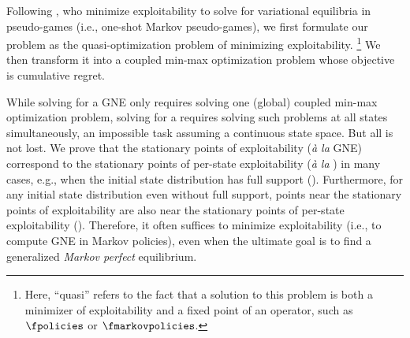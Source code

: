 Following \citet{goktas2022exploit}, who minimize exploitability to solve for variational equilibria in pseudo-games (i.e., one-shot Markov pseudo-games), we first formulate our problem as the quasi-optimization problem of minimizing exploitability.%
\footnote{Here, ``quasi'' refers to the fact that a solution to this problem is both a minimizer of exploitability and a fixed point of an operator, such as $\fpolicies$ or $\fmarkovpolicies$.}
We then transform it into a coupled min-max optimization problem whose
objective is cumulative regret.

While solving for a GNE only requires solving one (global) coupled min-max optimization problem, solving for a \MPGNE{} requires solving such problems at all states simultaneously, an impossible task assuming a continuous state space.
But all is not lost.
We prove that the stationary points of exploitability (\emph{\`a la\/} GNE) correspond to the stationary points of per-state exploitability (\emph{\`a la\/} \MPGNE) in many cases, e.g., when the initial state distribution has full support (). 
Furthermore, for any initial state distribution even without full support, points near the stationary points of exploitability are also near the stationary points of per-state exploitability ().
Therefore, it often suffices to minimize exploitability (i.e., to compute GNE in Markov policies), even when the ultimate goal is to find a generalized \emph{Markov perfect\/} equilibrium.
\fi


\fi

